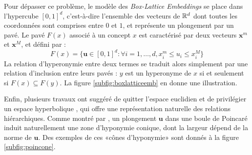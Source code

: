 Pour dépasser ce problème, le modèle des \textit{Box-Lattice Embeddings} \cite{vilnis2018probabilistic} se place dans l'hypercube $[0, 1]^d$, c'est-à-dire l'ensemble des vecteurs de $\mathbb{R}^d$ dont toutes les coordonnées sont comprises entre $0$ et $1$, et représente un plongement par un pavé. Le pavé $F(x)$ associé à un concept $x$ est caractérisé par deux vecteurs $\textbf{x}^m$ et $\textbf{x}^M$, et défini par :
\begin{equation}
    F(x) = \{ \textbf{u} \in [0, 1]^d : \forall i=1, \ldots, d, {} x_i^m \leq u_i \leq x_i^M \}
\end{equation}
La relation d'hyperonymie entre deux termes se traduit alors simplement par une relation d'inclusion entre leurs pavés : $y$ est un hyperonyme de $x$ si et seulement si $F(x) \subseteq F(y)$. La figure \ref{subfig:boxlatticeemb} en donne une illustration.

Enfin, plusieurs travaux ont suggéré de quitter l'espace euclidien et de privilégier un espace hyperbolique \cite{nickel2017poincare, nickel2018learning, Aly_2019, dhingra2018embedding, ganea2018hyperbolic}, qui offre une représentation naturelle des relations hiérarchiques. Comme montré par \cite{ganea2018hyperbolic}, un plongement $\textbf{u}$ dans une boule de Poincaré induit naturellement une zone d'hyponymie conique, dont la largeur dépend de la norme de $\textbf{u}$. Des exemples de ces «cônes d'hyponymie» sont donnés à la figure \ref{subfig:poincone}.


